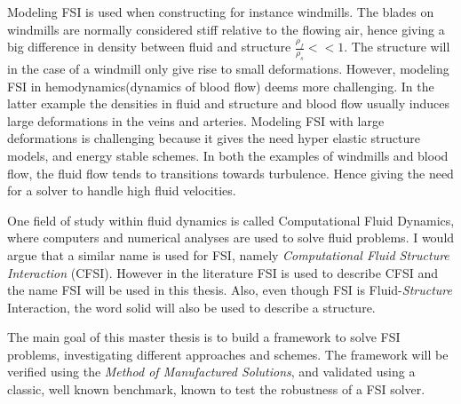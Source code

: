 Modeling FSI is used when constructing for instance windmills. The blades on windmills are normally considered stiff relative to the flowing air, hence giving a big difference in density between fluid and structure $\frac{\rho_f}{\rho_s} << 1$. The structure will in the case of a windmill only give rise to small deformations.
However, modeling FSI in hemodynamics(dynamics of blood flow) deems more challenging. In the latter example the densities in fluid and structure and blood flow usually induces large deformations in the veins and arteries. Modeling FSI with large deformations is challenging because it gives the need hyper elastic structure models, and energy stable schemes.
In both the examples of windmills and blood flow, the fluid flow tends to transitions towards turbulence. Hence giving the need for a solver to handle high fluid velocities. \newline

One field of study within fluid dynamics is called Computational Fluid Dynamics, where computers and numerical analyses are used to solve fluid problems.
I would argue that a similar name is used for FSI, namely \textit{Computational Fluid Structure Interaction} (CFSI). However in the literature FSI is used to describe CFSI and the name FSI will be used in this thesis. Also, even though FSI is Fluid-\textit{Structure} Interaction, the word solid will also be used to describe a structure. \newline

The main goal of this master thesis is to build a framework to solve FSI problems, investigating different approaches and schemes. The framework will be verified using the \textit{Method of Manufactured Solutions}, and validated using a classic, well known benchmark, known to test the robustness of a FSI solver.



